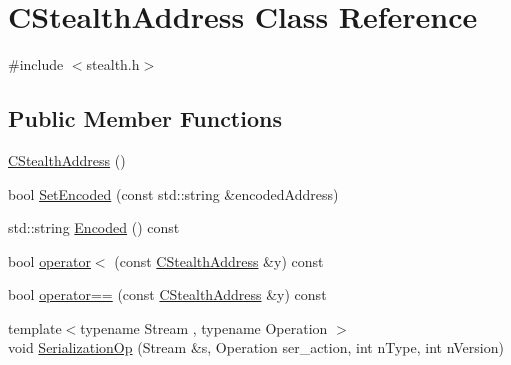 \hypertarget{class_c_stealth_address}{}\section{C\+Stealth\+Address Class Reference}
\label{class_c_stealth_address}


{\ttfamily \#include $<$stealth.\+h$>$}

\subsection*{Public Member Functions}
\begin{DoxyCompactItemize}
\item 
\hyperlink{class_c_stealth_address_adbc121fd61e98fd17a395b1dd081561a}{C\+Stealth\+Address} ()
\item 
bool \hyperlink{class_c_stealth_address_aa3f4655dced125bf698c208b6e7ac4b8}{Set\+Encoded} (const std\+::string \&encoded\+Address)
\item 
std\+::string \hyperlink{class_c_stealth_address_a7d331c1fb6e9479b31d35a50c4bb0f0c}{Encoded} () const 
\item 
bool \hyperlink{class_c_stealth_address_ab4eb491546beb4e7b16ef871d90eec2e}{operator$<$} (const \hyperlink{class_c_stealth_address}{C\+Stealth\+Address} \&y) const 
\item 
bool \hyperlink{class_c_stealth_address_a12d95d589b15a49eb4654400e0b67e46}{operator==} (const \hyperlink{class_c_stealth_address}{C\+Stealth\+Address} \&y) const 
\item 
{\footnotesize template$<$typename Stream , typename Operation $>$ }\\void \hyperlink{class_c_stealth_address_aa69f3712f4f7fdd8a4644223b5b7690a}{Serialization\+Op} (Stream \&s, Operation ser\+\_\+action, int n\+Type, int n\+Version)
\end{DoxyCompactItemize}
